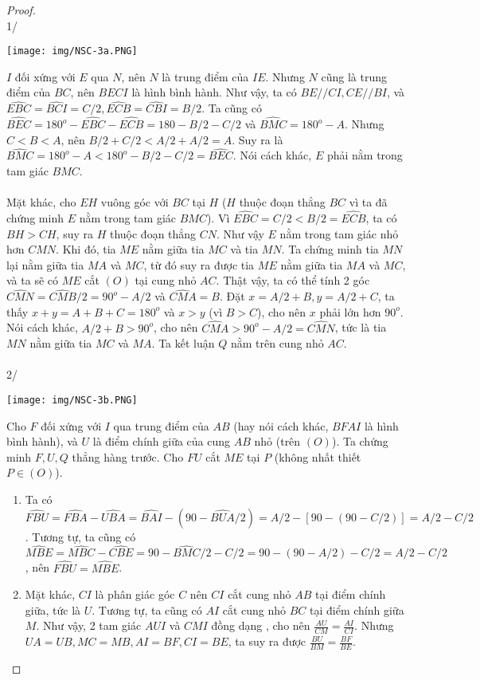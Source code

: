 \documentclass{treatise}
\begin{document}
\begin{proof} \ \\
1/
\begin{center}
	\texttt{[image: img/NSC-3a.PNG]}
\end{center}
$I$ đối xứng với $E$ qua $N$, nên $N$ là trung điểm của $IE$. Nhưng $N$ cũng là trung điểm của $BC$, nên $BECI$ là hình bình hành. Như vậy, ta có $BE // CI, CE // BI$, và $\hat{EBC} = \hat{BCI} = C/2, \hat{ECB} = \hat{CBI} = B/2$. Ta cũng có $\hat{BEC} = 180^o - \hat{EBC} - \hat{ECB} = 180 - B/2 - C/2$ và $\hat{BMC} = 180^o - A$. Nhưng $C < B < A$, nên $B/2 + C/2 < A/2 + A/2 = A$. Suy ra là $\hat{BMC} = 180^o - A < 180^o - B/2 - C/2 = \hat{BEC}$. Nói cách khác, $E$ phải nằm trong tam giác $BMC$.
\\
\\
Mặt khác, cho $EH$ vuông góc với $BC$ tại $H$ ($H$ thuộc đoạn thẳng $BC$ vì ta đã chứng minh $E$ nằm trong tam giác $BMC$). Vì $\hat{EBC} = C/2 < B/2 = \hat{ECB}$, ta có $BH > CH$, suy ra $H$ thuộc đoạn thẳng $CN$. Như vậy $E$ nằm trong tam giác nhỏ hơn $CMN$. Khi đó, tia $ME$ nằm giữa tia $MC$ và tia $MN$. Ta chứng minh tia $MN$ lại nằm giữa tia $MA$ và $MC$, từ đó suy ra được tia $ME$ nằm giữa tia $MA$ và $MC$, và ta sẽ có $ME$ cắt $(O)$ tại cung nhỏ $AC$. Thật vậy, ta có thể tính 2 góc $\hat{CMN} = \hat{CMB}/2 = 90^o - A/2$ và $\hat{CMA} = B$. Đặt $x = A/2 + B, y = A/2 + C$, ta thấy $x + y = A + B + C = 180^o$ và $x > y$ (vì $B > C$), cho nên $x$ phải lớn hơn $90^o$. Nói cách khác, $A/2 + B > 90^o$, cho nên $\hat{CMA} > 90^o - A/2 = \hat{CMN}$, tức là tia $MN$ nằm giữa tia $MC$ và $MA$. Ta kết luận $Q$ nằm trên cung nhỏ $AC$.
\\
\\
2/
\begin{center}
	\texttt{[image: img/NSC-3b.PNG]}
\end{center}
Cho $F$ đối xứng với $I$ qua trung điểm của $AB$ (hay nói cách khác, $BFAI$ là hình bình hành), và $U$ là điểm chính giữa của cung $AB$ nhỏ (trên $(O)$). Ta chứng minh $F, U, Q$ thẳng hàng trước. Cho $FU$ cắt $ME$ tại $P$ (không nhất thiết $P \in (O)$).
\begin{enumerate}
	\item Ta có $\hat{FBU} = \hat{FBA} - \hat{UBA} = \hat{BAI} - (90 - \hat{BUA}/2) = A/2 - [90 - (90 - C/2)] = A/2 - C/2$. Tương tự, ta cũng có $\hat{MBE} = \hat{MBC} - \hat{CBE} = 90 - \hat{BMC}/2 - C/2 = 90 - (90 - A/2) - C/2 = A/2 - C/2$, nên $\hat{FBU} = \hat{MBE}$.
	\item Mặt khác, $CI$ là phân giác góc $C$ nên $CI$ cắt cung nhỏ $AB$ tại điểm chính giữa, tức là $U$. Tương tự, ta cũng có $AI$ cắt cung nhỏ $BC$ tại điểm chính giữa $M$. Như vậy, 2 tam giác $AUI$ và $CMI$ đồng dạng , cho nên $\frac{AU}{CM} = \frac{AI}{CI}$. Nhưng $UA = UB, MC = MB, AI = BF, CI = BE$, ta suy ra được $\frac{BU}{BM} = \frac{BF}{BE}$.

\end{enumerate}
\end{proof}
\end{document}
